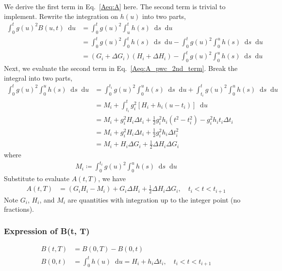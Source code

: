 \documentclass[12pt]{article}
\newcommand{\dd}{\mathop{}\!\text{d}}
\newcommand{\half}{\frac{1}{2}}
\begin{document}
\begin{appendices}
We derive the first term in Eq.~\ref{Aeq:A} here. The second term is trivial to
implement. Rewrite the integration on $h(u)$ into two parts,
\begin{align}
    \nonumber
    \int_0^t g(u)^2 B(u, t) \dd u &= \int_0^t g(u)^2 \int_u^t h(s) \dd s \dd u \\
        \nonumber
        &= \int_0^t g(u)^2 \int_0^t h(s) \dd s \dd u 
            - \int_0^t g(u)^2 \int_0^u h(s) \dd s \dd u \\
        \label{Aeq:A_pwc_2nd_term}
        &=(G_i + \Delta G_i) (H_i + \Delta H_i) 
            - \int_0^t g(u)^2 \int_0^u h(s) \dd s \dd u 
\end{align}
Next, we evaluate the second term in Eq.~\ref{Aeq:A_pwc_2nd_term}. Break the
integral into two parts,
\begin{align}
    \nonumber
    \int_0^t g(u)^2 \int_0^u h(s) \dd s \dd u  &= 
        \int_0^{t_i} g(u)^2 \int_0^u h(s) \dd s \dd u + 
        \int_{t_i}^t g(u)^2 \int_0^u h(s) \dd s \dd u \\
        \nonumber
        &= M_i + \int_{t_i}^t g_i^2 \left[
                H_i + h_i( u - t_i)
            \right] \dd u \\
        \nonumber
        &= M_i +
        g_i^2 H_i \Delta t_i + \half g_i^2 h_i (t^2 - t_i^2)
        - g_i^2 h_i t_i \Delta t_i \\
        \nonumber
        &=M_i + g_i^2 H_i \Delta t_i + \half g_i^2 h_i \Delta t_i^2 \\
        &= M_i + H_i \Delta G_i + \half \Delta H_i \Delta G_i
\end{align}
where
\begin{align}
    M_i \coloneqq \int_0^{t_i} g(u)^2 \int_0^u h(s) \dd s \dd u 
\end{align}
Substitute to evaluate $A(t, T)$, we have
\begin{align}
    A(t, T) &= (G_i H_i - M_i) + G_i \Delta H_i + \half \Delta H_i \Delta G_i, \quad t_i < t < t_{i+1}
\end{align}
Note $G_i$, $H_i$, and $M_i$ are quantities with integration up to the integer point (no fractions). 

\subsubsection{Expression of B(t, T)}
\begin{align}
    B(t, T) &= B(0, T) - B(0, t)\\
    B(0, t) &= \int_0^t h(u) \dd u = H_i + h_i\Delta t_i, \quad t_i < t < t_{i+1}
\end{align}


\end{appendices}
\end{document}
